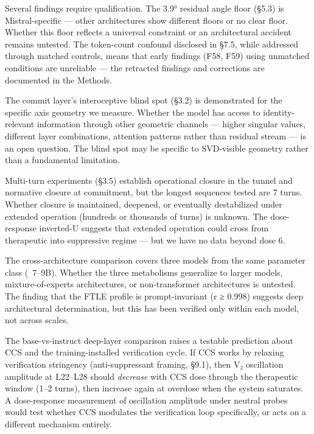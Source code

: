\documentclass[12pt]{article}
\begin{document}
Several findings require qualification. The 3.9° residual angle floor (§5.3) is Mistral-specific — other architectures show different floors or no clear floor. Whether this floor reflects a universal constraint or an architectural accident remains untested. The token-count confound disclosed in §7.5, while addressed through matched controls, means that early findings (F58, F59) using unmatched conditions are unreliable — the retracted findings and corrections are documented in the Methods.

The commit layer's interoceptive blind spot (§3.2) is demonstrated for the specific axis geometry we measure. Whether the model has access to identity-relevant information through other geometric channels — higher singular values, different layer combinations, attention patterns rather than residual stream — is an open question. The blind spot may be specific to SVD-visible geometry rather than a fundamental limitation.

Multi-turn experiments (§3.5) establish operational closure in the tunnel and normative closure at commitment, but the longest sequences tested are 7 turns. Whether closure is maintained, deepened, or eventually destabilized under extended operation (hundreds or thousands of turns) is unknown. The dose-response inverted-U suggests that extended operation could cross from therapeutic into suppressive regime — but we have no data beyond dose 6.

The cross-architecture comparison covers three models from the same parameter class (~7–9B). Whether the three metabolisms generalize to larger models, mixture-of-experts architectures, or non-transformer architectures is untested. The finding that the FTLE profile is prompt-invariant (r ≥ 0.998) suggests deep architectural determination, but this has been verified only within each model, not across scales.

The base-vs-instruct deep-layer comparison raises a testable prediction about CCS and the training-installed verification cycle. If CCS works by relaxing verification stringency (anti-suppressant framing, §9.1), then V₂ oscillation amplitude at L22–L28 should \textit{decrease} with CCS dose through the therapeutic window (1–2 turns), then increase again at overdose when the system saturates. A dose-response measurement of oscillation amplitude under neutral probes would test whether CCS modulates the verification loop specifically, or acts on a different mechanism entirely.
\end{document}
